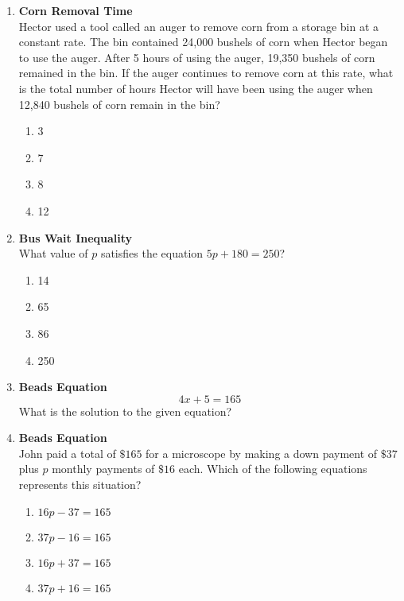 \begin{enumerate}
\item \textbf{Corn Removal Time}\\
Hector used a tool called an auger to remove corn from a storage bin at a constant rate. The bin contained 24,000 bushels of corn when Hector began to use the auger. After 5 hours of using the auger, 19,350 bushels of corn remained in the bin. If the auger continues to remove corn at this rate, what is the total number of hours Hector will have been using the auger when 12,840 bushels of corn remain in the bin?
\begin{enumerate}[label=(\Alph*)]
  \item 3
  \item 7
  \item 8
  \item 12
\end{enumerate}
\begin{subanswer}
\end{subanswer}

\item \textbf{Bus Wait Inequality}\\
What value of $p$ satisfies the equation $5p + 180 = 250$?
\begin{enumerate}[label=(\Alph*)]
  \item 14
  \item 65
  \item 86
  \item 250
\end{enumerate}
\begin{subanswer}
\end{subanswer}

\item \textbf{Beads Equation}\\
$$
4x + 5 = 165
$$
What is the solution to the given equation?
\begin{subanswer}
\end{subanswer}

\item \textbf{Beads Equation}\\
John paid a total of $\$ 165$ for a microscope by making a down payment of $\$ 37$ plus $p$ monthly payments of $\$ 16$ each. Which of the following equations represents this situation?
\begin{enumerate}[label=(\Alph*)]
  \item $16p - 37 = 165$
  \item $37p - 16 = 165$
  \item $16p + 37 = 165$
  \item $37p + 16 = 165$
\end{enumerate}
\begin{subanswer}
\end{subanswer}


\end{enumerate}
